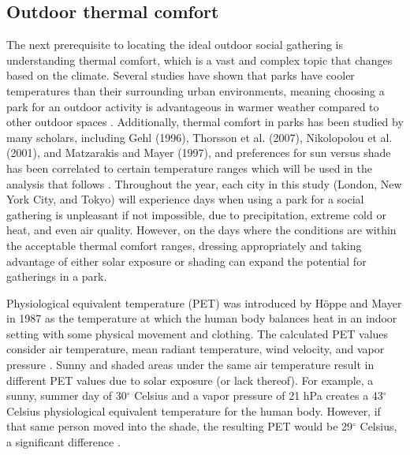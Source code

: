 \begin{multicols}{2}
\section{Outdoor thermal comfort}\label{thermal_comfort}
The next prerequisite to locating the ideal outdoor social gathering is understanding thermal comfort, which is a vast and complex topic that changes based on the climate. Several studies have shown that parks have cooler temperatures than their surrounding urban environments, meaning choosing a park for an outdoor activity is advantageous in warmer weather compared to other outdoor spaces \cite{spronken-smith_thermal_1998}\cite{cohen_methodological_2014}. Additionally, thermal comfort in parks has been studied by many scholars, including Gehl (1996), Thorsson et al. (2007), Nikolopolou et al. (2001), and Matzarakis and Mayer (1997), and preferences for sun versus shade has been correlated to certain temperature ranges which will be used in the analysis that follows \cite{gehl_life_2011}\cite{thorsson_thermal_2007}\cite{nikolopoulou_thermal_2001}\cite{matzarakis_applications_1999}. Throughout the year, each city in this study (London, New York City, and Tokyo) will experience days when using a park for a social gathering is unpleasant if not impossible, due to precipitation, extreme cold or heat, and even air quality. However, on the days where the conditions are within the acceptable thermal comfort ranges, dressing appropriately and taking advantage of either solar exposure or shading can expand the potential for gatherings in a park. 

Physiological equivalent temperature (PET) was introduced by Höppe and Mayer in 1987 as the temperature at which the human body balances heat in an indoor setting with some physical movement and clothing. The calculated PET values consider air temperature, mean radiant temperature, wind velocity, and vapor pressure \cite{hoppe_physiological_1999}. Sunny and shaded areas under the same air temperature result in different PET values due to solar exposure (or lack thereof). For example, a sunny, summer day of 30$^{\circ}$ Celsius and a vapor pressure of 21 hPa creates a 43$^{\circ}$ Celsius physiological equivalent temperature for the human body. However, if that same person moved into the shade, the resulting PET would be 29$^{\circ}$ Celsius, a significant difference \cite{hoppe_physiological_1999}. 

\end{multicols}

